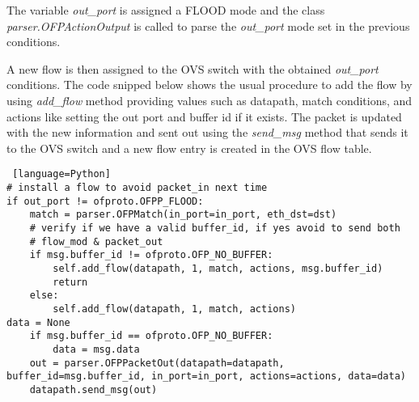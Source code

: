The variable \textit{out\_port} is assigned a FLOOD mode and the class \textit{parser.OFPActionOutput} is called to parse the \textit{out\_port} mode set in the previous conditions. 

A new flow is then assigned to the OVS switch with the obtained \textit{out\_port} conditions. The code snipped below shows the usual procedure to add the flow by using \textit{add\_flow} method providing values such as datapath, match conditions, and actions like setting the out port and buffer id if it exists. The packet is updated with the new information and sent out using the \textit{send\_msg} method that sends it to the OVS switch and a new flow entry is created in the OVS flow table.

\begin{lstlisting} [language=Python]
# install a flow to avoid packet_in next time
if out_port != ofproto.OFPP_FLOOD:
	match = parser.OFPMatch(in_port=in_port, eth_dst=dst)
	# verify if we have a valid buffer_id, if yes avoid to send both
	# flow_mod & packet_out
	if msg.buffer_id != ofproto.OFP_NO_BUFFER:
		self.add_flow(datapath, 1, match, actions, msg.buffer_id)
		return
	else:
		self.add_flow(datapath, 1, match, actions)
data = None
	if msg.buffer_id == ofproto.OFP_NO_BUFFER:
		data = msg.data
	out = parser.OFPPacketOut(datapath=datapath, buffer_id=msg.buffer_id, in_port=in_port, actions=actions, data=data)
	datapath.send_msg(out)
\end{lstlisting}
